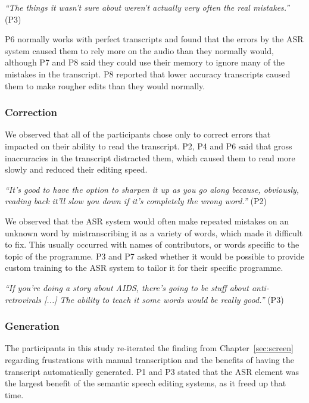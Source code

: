 \textit{``The things it wasn't sure about weren't actually very often the real mistakes.''} (P3)



P6 normally works with perfect transcripts and found that the errors by the ASR system caused them to rely more on
the audio than they normally would, although P7 and P8 said they could use their memory to ignore many of the mistakes
in the transcript.  P8 reported that lower accuracy transcripts caused them to make rougher edits than they would
normally.





\subsubsection{Correction}

We observed that all of the participants chose only to correct errors that impacted on their ability to
read the transcript.  P2, P4 and P6 said that gross inaccuracies in the transcript distracted them, which caused them
to read more slowly and reduced their editing speed.

\textit{``It's good to have the option to sharpen it up as you go along because, obviously, reading back it'll slow
you down if it's completely the wrong word.''} (P2)


We observed that the ASR system would often make repeated mistakes on an unknown word by mistranscribing it
as a variety of words, which made it difficult to fix.  This usually occurred with names of contributors, or words
specific to the topic of the programme.  P3 and P7 asked whether it would be possible to provide custom training to the
ASR system to tailor it for their specific programme.

\textit{``If you're doing a story about AIDS, there's going to be stuff about anti-retrovirals [...]
The ability to teach it some words would be really good.''} (P3)


\subsubsection{Generation}

The participants in this study re-iterated the finding from Chapter~\ref{sec:screen} regarding frustrations with manual
transcription and the benefits of having the transcript automatically generated.
P1 and P3 stated that the ASR element was the largest benefit of the semantic speech editing systems, as it
freed up that time.

